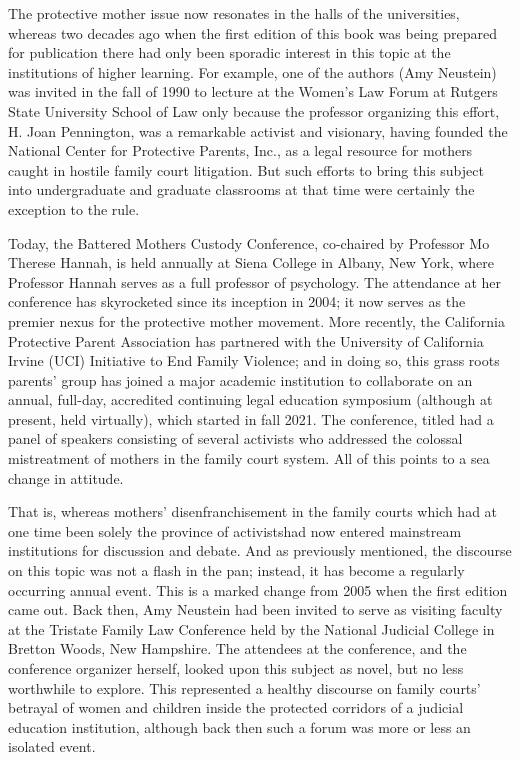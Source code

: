 \noindent{}The protective mother issue now resonates in the halls of the universities, whereas two decades ago when the first edition of this book was
being prepared for publication there had only been sporadic interest in this 
topic at the institutions of higher learning. For example, one of the authors 
(Amy Neustein) was invited
in the fall of 1990 to lecture at the Women's Law Forum at Rutgers State
University School of Law only because the professor organizing this
effort, H. Joan Pennington, was a remarkable activist and visionary, having founded the National Center for Protective Parents, Inc., as a legal
resource for mothers caught in hostile family court litigation. But such
efforts to bring this subject into undergraduate and graduate classrooms
at that time were certainly the exception to the rule. \pfl{}

Today, the Battered Mothers Custody Conference, co-chaired by Professor Mo Therese Hannah, is held annually at Siena College in Albany,
New York, where Professor Hannah serves as a full professor of psychology.
The attendance at her conference has skyrocketed since
its inception in 2004; it now serves as the premier nexus for the 
protective mother movement. More recently, the California Protective Parent
Association has partnered with the University of California Irvine (UCI)
Initiative to End Family Violence; and in doing so, this grass roots
parents' group has joined a major academic institution to collaborate
on an annual, full-day, accredited continuing legal education 
symposium (although at present, held virtually), which started in fall 2021. The
conference, titled \hspace{1pt} had a panel of speakers consisting
of several activists who addressed the colossal mistreatment of mothers
in the family court system. All of this points to a sea change in attitude. \pfl{}

\vspace{-1.4em}
That is, whereas mothers' disenfranchisement in the family courts\mdash{}
which had at one time been solely the province of activists\mdash{}had now
entered mainstream institutions for discussion and debate. And as
previously mentioned, the discourse on this topic was not a flash in the
pan; instead, it has become a regularly occurring annual event. This is
a marked change from 2005 when the first edition came out. Back then,
Amy Neustein had been invited to serve as visiting faculty at the
Tristate Family Law Conference held by the National Judicial College
in Bretton Woods, New Hampshire. The attendees at the conference,
and the conference organizer herself, looked upon this subject as novel,
but no less worthwhile to explore. This represented a healthy discourse
on family courts' betrayal of women and children inside the protected
corridors of a judicial education institution, although back then such a
forum was more or less an isolated event. \pfl{}

